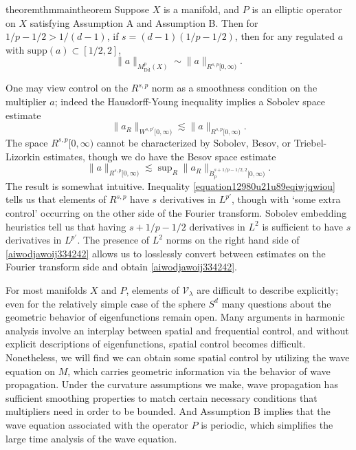 \begin{restatable}{theorem}{thmmaintheorem} \label{maintheorem}
  Suppose $X$ is a manifold, and $P$ is an elliptic operator on $X$ satisfying Assumption A and Assumption B. Then for $1/p - 1/2 > 1/(d-1)$, if $s = (d-1)(1/p - 1/2)$, then for any regulated $a$ with $\text{supp}(a) \subset [1/2,2]$,
  \[ \| a \|_{M^p_{\text{Dil}}(X)} \sim \| a \|_{R^{s,p}[0,\infty)}. \]
\end{restatable}

One may view control on the $R^{s,p}$ norm as a smoothness condition on the multiplier $a$; indeed the Hausdorff-Young inequality implies a Sobolev space estimate
%
\begin{equation} \label{equation12980u21u89eqiwjqwiou}
  \| a_R \|_{W^{s,p'}[0,\infty)} \lesssim \| a \|_{R^{s,p}[0,\infty)}.
\end{equation}
%
The space $R^{s,p}[0,\infty)$ cannot be characterized by Sobolev, Besov, or Triebel-Lizorkin estimates, though we do have the Besov space estimate
%
\begin{equation} \label{aiwodjawoij334242}
  \| a \|_{R^{s,p}[0,\infty)} \lesssim \sup\nolimits_R \| a_R \|_{\dot{B}^{s+1/p - 1/2,2}_p[0,\infty)}.
\end{equation}
%
The result is somewhat intuitive. Inequality \eqref{equation12980u21u89eqiwjqwiou} tells us that elements of $R^{s,p}$ have $s$ derivatives in $L^{p'}$, though with `some extra control' occurring on the other side of the Fourier transform. Sobolev embedding heuristics tell us that having $s + 1/p - 1/2$ derivatives in $L^2$ is sufficient to have $s$ derivatives in $L^{p'}$. The presence of $L^2$ norms on the right hand side of \eqref{aiwodjawoij334242} allows us to losslessly convert between estimates on the Fourier transform side and obtain \eqref{aiwodjawoij334242}.

% 

For most manifolds $X$ and $P$, elements of $\mathcal{V}_\lambda$ are difficult to describe explicitly; even for the relatively simple case of the sphere $S^d$ many questions about the geometric behavior of eigenfunctions remain open. Many arguments in harmonic analysis involve an interplay between spatial and frequential control, and without explicit descriptions of eigenfunctions, spatial control becomes difficult. Nonetheless, we will find we can obtain some spatial control by utilizing the wave equation on $M$, which carries geometric information via the behavior of wave propagation. Under the curvature assumptions we make, wave propagation has sufficient smoothing properties to match certain necessary conditions that multipliers need in order to be bounded. And Assumption B implies that the wave equation associated with the operator $P$ is periodic, which simplifies the large time analysis of the wave equation.

